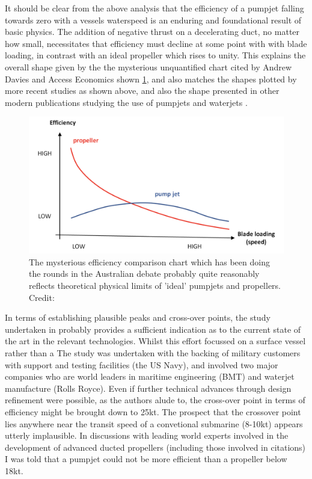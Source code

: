 \documentclass{article}\usepackage[]{graphicx}\usepackage[]{color}
\begin{document}
It should be clear from the above analysis that the efficiency of a pumpjet falling towards zero with a vessels waterspeed is an enduring and foundational result of basic physics.  The addition of negative thrust on a decelerating duct, no matter how small, necessitates that efficiency must decline at some point with with blade loading, in contrast with an ideal propeller which rises to unity.  This explains the overall shape given by the the mysterious unquantified chart cited by Andrew Davies \parencite{davies2017} and Access Economics \parencite{stanford2017} shown \ref{fig:PumpUp.png}, and also matches the shapes plotted by more recent studies as shown above, and also the shape presented in other modern publications studying the use of pumpjets \parencite{giles2010} and waterjets \parencite{fujisawa1995}.

\begin{figure}
\includegraphics[width=\textwidth]{PumpUp.png}
\caption{The mysterious efficiency comparison chart which has been doing the rounds in the Australian debate probably quite reasonably reflects theoretical physical limits of 'ideal' pumpjets and propellers. Credit: \cite{stanford2017}}
\label{fig:PumpUp.png}
\end{figure}

In terms of establishing plausible peaks and cross-over points, the study undertaken in \cite{giles2010} probably provides a sufficient indication as to the current state of the art in the relevant technologies.  Whilst this effort focussed on a surface vessel rather than a   The study was undertaken with the backing of military customers with support and testing facilities (the US Navy), and involved two major companies who are world leaders in maritime engineering (BMT) and waterjet manufacture (Rolls Royce). Even if further technical advances through design refinement were possible, as the authors alude to, the cross-over point in terms of efficiency might be brought down to 25kt.  The prospect that the crossover point lies anywhere near the transit speed of a convetional submarine (8-10kt) appears utterly implausible. In discussions with leading world experts involved in the development of advanced ducted propellers (including those involved in citations) I was told that a pumpjet could not be more efficient than a propeller below 18kt.
\end{document}
